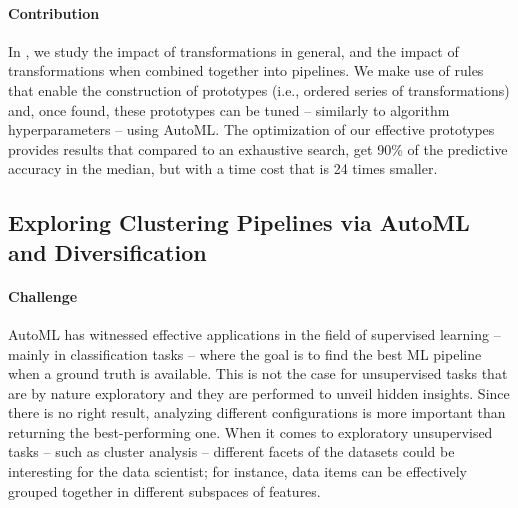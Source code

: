 \paragraph{Contribution} In , we study the impact of transformations in general, and the impact of transformations when combined together into pipelines.
We make use of rules that enable the construction of prototypes (i.e., ordered series of transformations) and, once found, these prototypes can be tuned -- similarly to algorithm hyperparameters -- using AutoML.
The optimization of our effective prototypes provides results that compared to an exhaustive search, get 90\% of the predictive accuracy in the median, but with a time cost that is 24 times smaller.

\subsection*{Exploring Clustering Pipelines via AutoML and Diversification}


\paragraph{Challenge} AutoML has witnessed effective applications in the field of supervised learning -- mainly in classification tasks --  where the goal is to find the best ML pipeline when a ground truth is available.
This is not the case for unsupervised tasks that are by nature exploratory and they are performed to unveil hidden insights.
Since there is no right result, analyzing different configurations is more important than returning the best-performing one.
When it comes to exploratory unsupervised tasks -- such as cluster analysis --  different facets of the datasets could be interesting for the data scientist; for instance, data items can be effectively grouped together in different subspaces of features.

